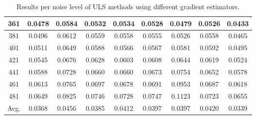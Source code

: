 \begin{table}[ht!]
\begin{tabular}{c|c|c|c|c|c|c|c|c}
361 & 0.0478 & 0.0584 & 0.0532 & 0.0534 & 0.0528 & 0.0479 & 0.0526 & 0.0433 \\ \hline
381 & 0.0496 & 0.0612 & 0.0559 & 0.0558 & 0.0555 & 0.0526 & 0.0558 & 0.0465 \\ \hline
401 & 0.0511 & 0.0649 & 0.0588 & 0.0566 & 0.0567 & 0.0581 & 0.0592 & 0.0495 \\ \hline
421 & 0.0545 & 0.0676 & 0.0628 & 0.0603 & 0.0608 & 0.0644 & 0.0619 & 0.0524 \\ \hline
441 & 0.0588 & 0.0728 & 0.0660 & 0.0660 & 0.0673 & 0.0754 & 0.0652 & 0.0578 \\ \hline
461 & 0.0613 & 0.0765 & 0.0697 & 0.0678 & 0.0691 & 0.0953 & 0.0687 & 0.0618 \\ \hline
481 & 0.0649 & 0.0825 & 0.0746 & 0.0728 & 0.0747 & 0.1123 & 0.0723 & 0.0655 \\ \hline
Avg.  & 0.0368 & 0.0456 & 0.0385 & 0.0412 & 0.0397 & 0.0397 & 0.0420 & 0.0339 \\ \hline
\end{tabular}
\caption{Results per noise level of ULS methods using different gradient estimators.}
\label{tab:ULSperNoise}
\end{table}



